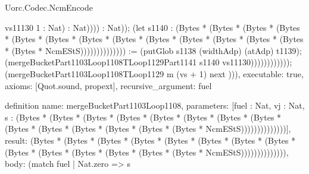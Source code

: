 \begin{lexlean}{Uorc.Codec.NcmEncode}
\begin{semanticmodule}
{vs11130 1 : Nat) : Nat)))) : Nat)); (let s1140 : (Bytes * (Bytes * (Bytes * (Bytes * (Bytes * (Bytes * (Bytes * (Bytes * (Bytes * (Bytes * (Bytes * (Bytes * (Bytes * (Bytes * NcmEStS)))))))))))))) := (putGlob s1138 (widthAdp) (atAdp) t1139); (mergeBucketPart1103Loop1108TLoop1129Part1141 s1140 vs11130)))))))))))); (mergeBucketPart1103Loop1108TLoop1129 m (vs + 1) next ))),
  executable: true,
  axioms: [Quot.sound, propext],
  recursive_argument: fuel
}

definition{
  name: mergeBucketPart1103Loop1108,
  parameters: [fuel : Nat, vj : Nat, s : (Bytes * (Bytes * (Bytes * (Bytes * (Bytes * (Bytes * (Bytes * (Bytes * (Bytes * (Bytes * (Bytes * (Bytes * (Bytes * (Bytes * NcmEStS))))))))))))))],
  result: (Bytes * (Bytes * (Bytes * (Bytes * (Bytes * (Bytes * (Bytes * (Bytes * (Bytes * (Bytes * (Bytes * (Bytes * (Bytes * (Bytes * NcmEStS)))))))))))))),
  body: (match fuel
    | Nat.zero => s
}
\end{semanticmodule}
\end{lexlean}

